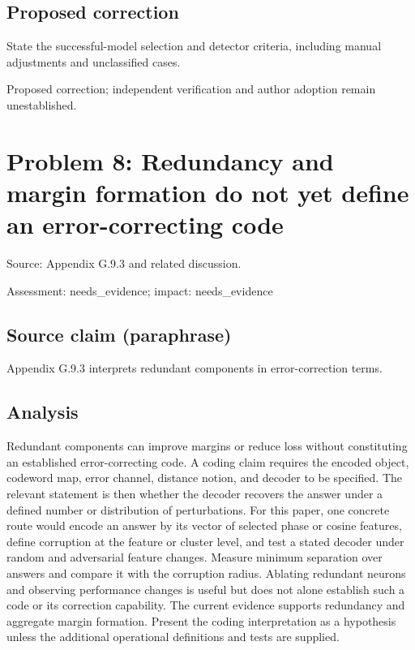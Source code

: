 \documentclass[11pt]{article}
\begin{document}
\subsection*{Proposed correction}

State the successful-model selection and detector criteria, including manual adjustments and unclassified cases.

Proposed correction; independent verification and author adoption remain unestablished.

\section*{Problem 8: Redundancy and margin formation do not yet define an error-correcting code}

Source: Appendix G.9.3 and related discussion.

Assessment: needs\_evidence; impact: needs\_evidence

\subsection*{Source claim (paraphrase)}

Appendix G.9.3 interprets redundant components in error-correction terms.

\subsection*{Analysis}

Redundant components can improve margins or reduce loss without constituting an established error-correcting code. A coding claim requires the encoded object, codeword map, error channel, distance notion, and decoder to be specified. The relevant statement is then whether the decoder recovers the answer under a defined number or distribution of perturbations. For this paper, one concrete route would encode an answer by its vector of selected phase or cosine features, define corruption at the feature or cluster level, and test a stated decoder under random and adversarial feature changes. Measure minimum separation over answers and compare it with the corruption radius. Ablating redundant neurons and observing performance changes is useful but does not alone establish such a code or its correction capability. The current evidence supports redundancy and aggregate margin formation. Present the coding interpretation as a hypothesis unless the additional operational definitions and tests are supplied.
\end{document}
